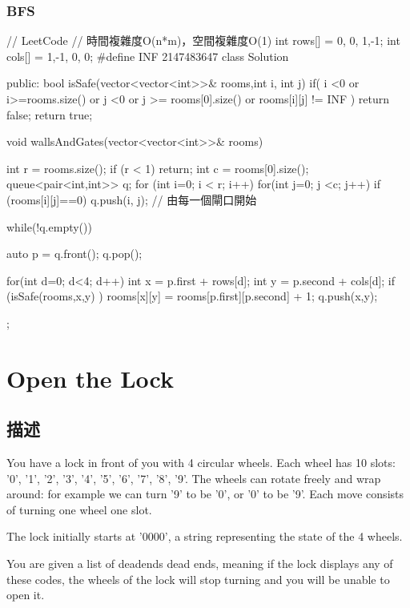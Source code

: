 \subsubsection{BFS}
\begin{Code}
// LeetCode
// 時間複雜度O(n*m)，空間複雜度O(1)
int rows[] = {0, 0, 1,-1};
int cols[] = {1,-1, 0, 0};
#define INF 2147483647
class Solution {
public:
    bool isSafe(vector<vector<int>>& rooms,int i, int j)
    {
        if( i <0 or i>=rooms.size() or j <0 or j >= rooms[0].size() or rooms[i][j] != INF )
            return false;
        return true;
    }

    void wallsAndGates(vector<vector<int>>& rooms) {
        int r = rooms.size();
        if (r < 1) return;
        int c = rooms[0].size();
        queue<pair<int,int>> q;
        for (int i=0; i < r; i++)
            for(int j=0; j <c; j++)
                if (rooms[i][j]==0)
                    q.push({i, j}); // 由每一個閘口開始

        while(!q.empty())
        {
            auto p = q.front(); q.pop();

            for(int d=0; d<4; d++)
            {
                int x = p.first  + rows[d];
                int y = p.second + cols[d];
                if (isSafe(rooms,x,y) )
                {
                    rooms[x][y] =  rooms[p.first][p.second] + 1;
                    q.push({x,y});
                }
            }
        }
    }
};
\end{Code}

\section{Open the Lock}
\label{sec:open-the-lock}

\subsection{描述}
You have a lock in front of you with 4 circular wheels. Each wheel has 10 slots: '0', '1', '2', '3', '4', '5', '6', '7', '8', '9'. The wheels can rotate freely and wrap around: for example we can turn '9' to be '0', or '0' to be '9'. Each move consists of turning one wheel one slot.

The lock initially starts at '0000', a string representing the state of the 4 wheels.

You are given a list of deadends dead ends, meaning if the lock displays any of these codes, the wheels of the lock will stop turning and you will be unable to open it.

